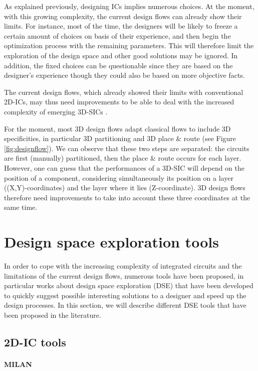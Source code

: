 As explained previously, designing ICs implies numerous choices. At the moment, with this growing complexity, the current design flows can already show their limits. For instance, most of the time, the designers will be likely to freeze a certain amount of choices on basis of their experience, and then begin the optimization process with the remaining parameters. This will therefore limit the exploration of the design space and other good solutions may be ignored. In addition, the fixed choices can be questionable since they are based on the designer's experience though they could also be based on more objective facts.

The current design flows, which already showed their limits with conventional 2D-ICs, may thus need improvements to be able to deal with the increased complexity of emerging 3D-SICs \cite{vanderbiest06, PFF10}.

For the moment, most 3D design flows adapt classical flows to include 3D specificities, in particular 3D partitioning and 3D place \& route (see Figure \ref{fig:designflow}). We can observe that these two steps are separated: the circuits are first (manually) partitioned, then the place \& route occurs for each layer. However, one can guess that the performances of a 3D-SIC will depend on the position of a component, considering simultaneously its position on a layer ((X,Y)-coordinates) and the layer where it lies (Z-coordinate). 3D design flows therefore need improvements to take into account these three coordinates at the same time.

\section{Design space exploration tools}

In order to cope with the increasing complexity of integrated circuits and the limitations of the current design flows, numerous tools have been proposed, in particular works about design space exploration (DSE) that have been developed to quickly suggest possible interesting solutions to a designer and speed up the design processes. In this section, we will describe different DSE tools that have been proposed in the literature.

\subsection{2D-IC tools}

\paragraph{MILAN}

